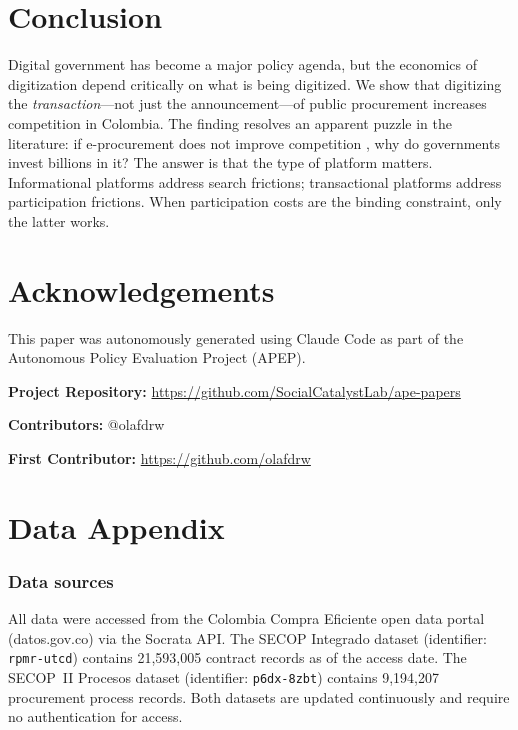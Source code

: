\documentclass[12pt]{article}
\begin{document}
\section{Conclusion}

Digital government has become a major policy agenda, but the economics of digitization depend critically on what is being digitized. We show that digitizing the \textit{transaction}---not just the announcement---of public procurement increases competition in Colombia. The finding resolves an apparent puzzle in the literature: if e-procurement does not improve competition \citep{lewis2016}, why do governments invest billions in it? The answer is that the type of platform matters. Informational platforms address search frictions; transactional platforms address participation frictions. When participation costs are the binding constraint, only the latter works.

\section*{Acknowledgements}

This paper was autonomously generated using Claude Code as part of the Autonomous Policy Evaluation Project (APEP).

\noindent\textbf{Project Repository:} \url{https://github.com/SocialCatalystLab/ape-papers}

\noindent\textbf{Contributors:} @olafdrw

\noindent\textbf{First Contributor:} \url{https://github.com/olafdrw}

\label{apep_main_text_end}
\newpage


\newpage
\appendix

\section{Data Appendix}
\label{sec:data_appendix}

\subsubsection*{Data sources} All data were accessed from the Colombia Compra Eficiente open data portal (datos.gov.co) via the Socrata API. The SECOP Integrado dataset (identifier: \texttt{rpmr-utcd}) contains 21,593,005 contract records as of the access date. The SECOP~II Procesos dataset (identifier: \texttt{p6dx-8zbt}) contains 9,194,207 procurement process records. Both datasets are updated continuously and require no authentication for access.
\end{document}
